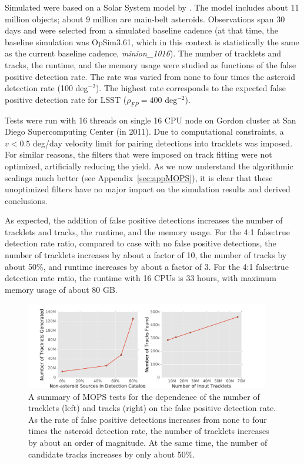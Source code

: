 Simulated \DIASources were based on a Solar System model by \citet{Grav2011}.
The model includes about 11 million objects; about 9 million are main-belt asteroids. Observations span
30 days and were selected from a simulated baseline cadence (at that time, the baseline simulation was
OpSim3.61, which in this context is statistically the same as the current baseline cadence, {\it minion\_1016}).
The number of tracklets and tracks, the runtime, and the memory usage were studied as functions of
the false positive detection rate. The rate was varied from none to four times the asteroid detection rate
(100 deg$^{-2}$).  The highest rate corresponds to the expected false positive detection rate for LSST
($\rho_{FP} =  400$ deg$^{-2}$).

Tests were run with 16 threads on single 16 CPU node on Gordon cluster at San Diego Supercomputing
Center (in 2011). Due to computational constraints, a $v < 0.5$ deg/day velocity limit for pairing detections
into tracklets was imposed. For similar reasons, the filters that were imposed on track fitting were not
optimized, artificially reducing the yield. As we now understand the algorithmic scalings much better
(see Appendix~\ref{sec:appMOPS}), it is clear that these unoptimized filters have no major impact on the
simulation results and derived conclusions.

As expected, the addition of false positive detections increases the number of tracklets and tracks,
the runtime, and the memory usage. For the 4:1 false:true detection rate ratio, compared to case with
no false positive detections, the number of tracklets increases by about
a factor of 10, the number of tracks by about 50\%, and runtime increases by about a factor of 3.
For the 4:1 false:true detection rate ratio, the runtime with 16 CPUs is 33 hours, with maximum memory
usage of about 80 GB.




\begin{figure}[t!]
\centering
\vskip -0.3in
\includegraphics[width=0.95\textwidth]{figures/track_stats}
\caption{A summary of MOPS tests for the dependence of the number of tracklets (left)
and tracks (right) on the false positive detection rate. As the rate of false positive detections
increases from none to four times the asteroid detection rate, the number of tracklets
increases by about an order of magnitude. At the same time, the number of candidate
tracks increases by only about 50\%.
\label{fig:MOPStests}}
\end{figure}




